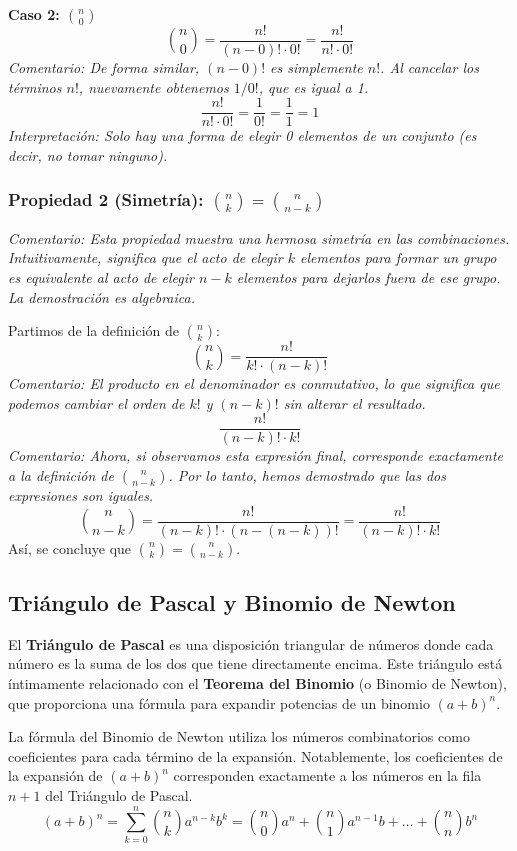\documentclass[12pt, letterpaper]{article}
\begin{document}
\vspace{1em}
\noindent \textbf{Caso 2: $\binom{n}{0}$}
\[ \binom{n}{0} = \frac{n!}{(n-0)! \cdot 0!} = \frac{n!}{n! \cdot 0!} \]
\textit{Comentario: De forma similar, $(n-0)!$ es simplemente $n!$. Al cancelar los términos $n!$, nuevamente obtenemos $1/0!$, que es igual a 1.}
\[ \frac{n!}{n! \cdot 0!} = \frac{1}{0!} = \frac{1}{1} = 1 \]
\textit{Interpretación: Solo hay una forma de elegir 0 elementos de un conjunto (es decir, no tomar ninguno).}

\subsubsection[Propiedad 2 (Simetría): C(n,k) = C(n, n-k)]{Propiedad 2 (Simetría): \texorpdfstring{$\binom{n}{k} = \binom{n}{n-k}$}{C(n,k) = C(n, n-k)}}
\textit{Comentario: Esta propiedad muestra una hermosa simetría en las combinaciones. Intuitivamente, significa que el acto de elegir $k$ elementos para formar un grupo es equivalente al acto de elegir $n-k$ elementos para dejarlos fuera de ese grupo. La demostración es algebraica.}

\vspace{1em}
\noindent Partimos de la definición de $\binom{n}{k}$:
\[ \binom{n}{k} = \frac{n!}{k! \cdot (n-k)!} \]
\textit{Comentario: El producto en el denominador es conmutativo, lo que significa que podemos cambiar el orden de $k!$ y $(n-k)!$ sin alterar el resultado.}
\[ \frac{n!}{(n-k)! \cdot k!} \]
\textit{Comentario: Ahora, si observamos esta expresión final, corresponde exactamente a la definición de $\binom{n}{n-k}$. Por lo tanto, hemos demostrado que las dos expresiones son iguales.}
\[ \binom{n}{n-k} = \frac{n!}{(n-k)! \cdot (n-(n-k))!} = \frac{n!}{(n-k)! \cdot k!} \]
Así, se concluye que $\binom{n}{k} = \binom{n}{n-k}$.

\subsection{Triángulo de Pascal y Binomio de Newton}
El \textbf{Triángulo de Pascal} es una disposición triangular de números donde cada número es la suma de los dos que tiene directamente encima. Este triángulo está íntimamente relacionado con el \textbf{Teorema del Binomio} (o Binomio de Newton), que proporciona una fórmula para expandir potencias de un binomio $(a+b)^n$.

La fórmula del Binomio de Newton utiliza los números combinatorios como coeficientes para cada término de la expansión. Notablemente, los coeficientes de la expansión de $(a+b)^n$ corresponden exactamente a los números en la fila $n+1$ del Triángulo de Pascal.
\[ (a+b)^n = \sum_{k=0}^{n} \binom{n}{k} a^{n-k} b^k = \binom{n}{0}a^n + \binom{n}{1}a^{n-1}b + \dots + \binom{n}{n}b^n \]
\end{document}
